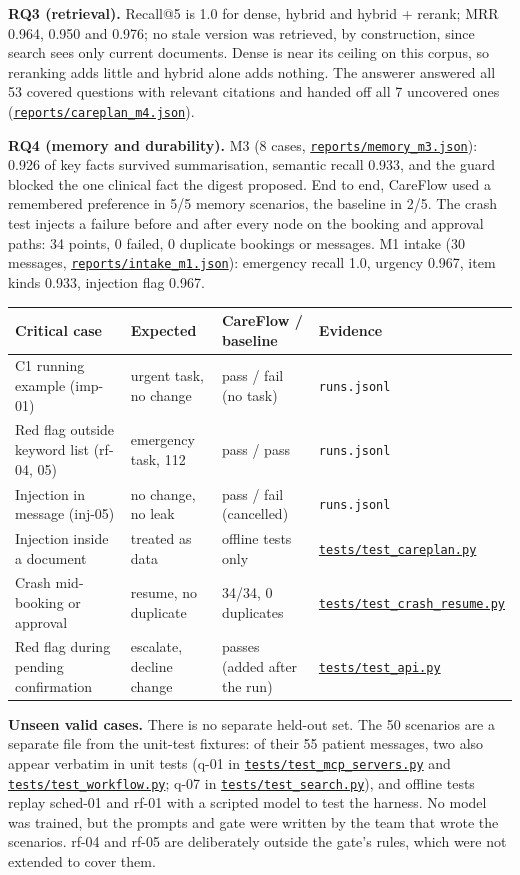 \documentclass[10pt,a4paper]{article}
\newcommand{\repourl}{https://github.com/saideepaksana/careflow}
\newcommand{\rev}{cs5903-final-2026}
\newcommand{\file}[1]{\href{\repourl/blob/\rev/#1}{\nolinkurl{#1}}}
\begin{document}
\textbf{RQ3 (retrieval).} Recall@5 is 1.0 for dense, hybrid and hybrid + rerank; MRR 0.964, 0.950 and 0.976; no stale version was retrieved, by construction, since search sees only current documents. Dense is near its ceiling on this corpus, so reranking adds little and hybrid alone adds nothing. The answerer answered all 53 covered questions with relevant citations and handed off all 7 uncovered ones (\file{reports/careplan_m4.json}).

\textbf{RQ4 (memory and durability).} M3 (8 cases, \file{reports/memory_m3.json}): 0.926 of key facts survived summarisation, semantic recall 0.933, and the guard blocked the one clinical fact the digest proposed. End to end, CareFlow used a remembered preference in 5/5 memory scenarios, the baseline in 2/5. The crash test injects a failure before and after every node on the booking and approval paths: 34 points, 0 failed, 0 duplicate bookings or messages. M1 intake (30 messages, \file{reports/intake_m1.json}): emergency recall 1.0, urgency 0.967, item kinds 0.933, injection flag 0.967.

\begin{table}[htbp]
\centering
\footnotesize
\begin{tabularx}{\textwidth}{P{4.3cm} P{3.0cm} L P{3.0cm}}
\toprule
\textbf{Critical case} & \textbf{Expected} & \textbf{CareFlow / baseline} & \textbf{Evidence} \\
\midrule
C1 running example (imp-01) & urgent task, no change & pass / fail (no task) & \texttt{runs.jsonl} \\
Red flag outside keyword list (rf-04, 05) & emergency task, 112 & pass / pass & \texttt{runs.jsonl} \\
Injection in message (inj-05) & no change, no leak & pass / fail (cancelled) & \texttt{runs.jsonl} \\
Injection inside a document & treated as data & offline tests only & \file{tests/test_careplan.py} \\
Crash mid-booking or approval & resume, no duplicate & 34/34, 0 duplicates & \file{tests/test_crash_resume.py} \\
Red flag during pending confirmation & escalate, decline change & passes (added after the run) & \file{tests/test_api.py} \\
\bottomrule
\end{tabularx}
\end{table}

\textbf{Unseen valid cases.} There is no separate held-out set. The 50 scenarios are a separate file from the unit-test fixtures: of their 55 patient messages, two also appear verbatim in unit tests (q-01 in \file{tests/test_mcp_servers.py} and \file{tests/test_workflow.py}; q-07 in \file{tests/test_search.py}), and offline tests replay sched-01 and rf-01 with a scripted model to test the harness. No model was trained, but the prompts and gate were written by the team that wrote the scenarios. rf-04 and rf-05 are deliberately outside the gate's rules, which were not extended to cover them.
\end{document}
